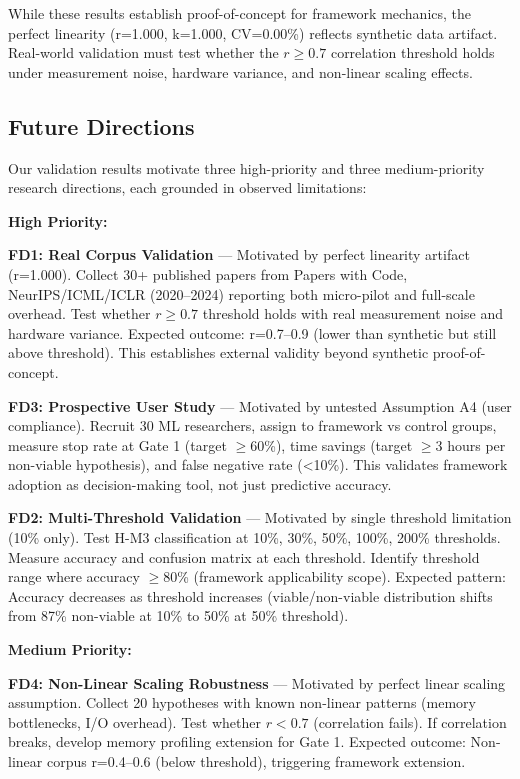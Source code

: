 While these results establish proof-of-concept for framework mechanics, the perfect linearity (r=1.000, k=1.000, CV=0.00\%) reflects synthetic data artifact. Real-world validation must test whether the $r \geq 0.7$ correlation threshold holds under measurement noise, hardware variance, and non-linear scaling effects.

\subsection{Future Directions}

Our validation results motivate three high-priority and three medium-priority research directions, each grounded in observed limitations:

\textbf{High Priority:}

\textbf{FD1: Real Corpus Validation} --- Motivated by perfect linearity artifact (r=1.000). Collect 30+ published papers from Papers with Code, NeurIPS/ICML/ICLR (2020--2024) reporting both micro-pilot and full-scale overhead. Test whether $r \geq 0.7$ threshold holds with real measurement noise and hardware variance. Expected outcome: r=0.7--0.9 (lower than synthetic but still above threshold). This establishes external validity beyond synthetic proof-of-concept.

\textbf{FD3: Prospective User Study} --- Motivated by untested Assumption A4 (user compliance). Recruit 30 ML researchers, assign to framework vs control groups, measure stop rate at Gate 1 (target $\geq$60\%), time savings (target $\geq$3 hours per non-viable hypothesis), and false negative rate (<10\%). This validates framework adoption as decision-making tool, not just predictive accuracy.

\textbf{FD2: Multi-Threshold Validation} --- Motivated by single threshold limitation (10\% only). Test H-M3 classification at 10\%, 30\%, 50\%, 100\%, 200\% thresholds. Measure accuracy and confusion matrix at each threshold. Identify threshold range where accuracy $\geq$80\% (framework applicability scope). Expected pattern: Accuracy decreases as threshold increases (viable/non-viable distribution shifts from 87\% non-viable at 10\% to 50\% at 50\% threshold).

\textbf{Medium Priority:}

\textbf{FD4: Non-Linear Scaling Robustness} --- Motivated by perfect linear scaling assumption. Collect 20 hypotheses with known non-linear patterns (memory bottlenecks, I/O overhead). Test whether $r < 0.7$ (correlation fails). If correlation breaks, develop memory profiling extension for Gate 1. Expected outcome: Non-linear corpus r=0.4--0.6 (below threshold), triggering framework extension.

